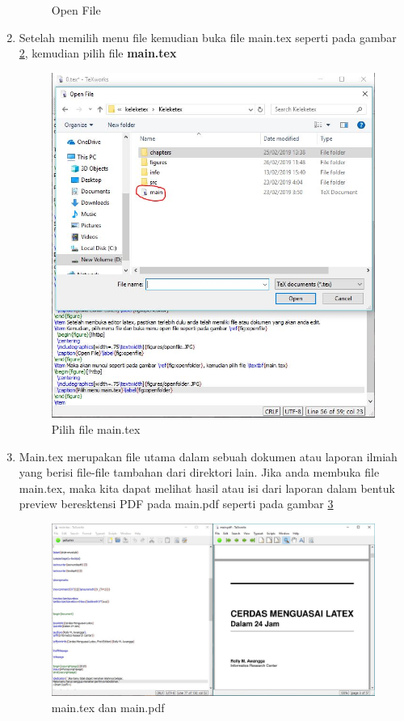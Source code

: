 \begin{enumerate}
\begin{figure}[!htbp]
  \caption{Open File}\label{fig:openfile}
\end{figure}
\item Setelah memilih menu file kemudian buka file main.tex seperti pada gambar \ref{fig:openfolder}, kemudian pilih file \textbf{main.tex}
\begin{figure}[!htbp]
  \centering
  \includegraphics[width=.75\textwidth]{figures/openfolder.JPG}
  \caption{Pilih file main.tex}\label{fig:openfolder}
\end{figure}
\item Main.tex merupakan file utama dalam sebuah dokumen atau laporan ilmiah yang berisi file-file tambahan dari direktori lain. Jika anda membuka file main.tex, maka kita dapat melihat hasil atau isi dari laporan dalam bentuk preview beresktensi PDF pada main.pdf seperti pada gambar \ref{fig:main}
  \begin{figure}[!htbp]
  \centering
  \includegraphics[width=.75\textwidth]{figures/main.JPG}
  \caption{main.tex dan main.pdf}\label{fig:main}
\end{figure}

\end{enumerate}
